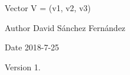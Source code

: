Vector V = (v1, v2, v3) \begin{DoxyAuthor}{Author}
David Sánchez Fernández 
\end{DoxyAuthor}
\begin{DoxyDate}{Date}
2018-\/7-\/25 
\end{DoxyDate}
\begin{DoxyVersion}{Version}
1. 
\end{DoxyVersion}
